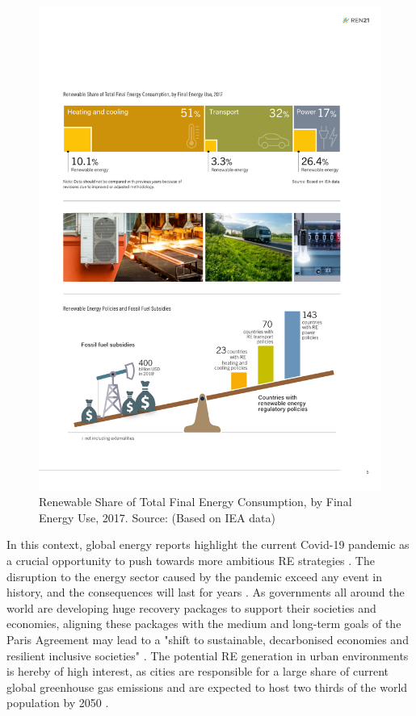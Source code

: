 \begin{figure}
\centering 
\includegraphics[width=\textwidth]{images/gsr_2020_RE_share.pdf} 
\caption[Renewable Share of Total Final Energy Consumption, by Final Energy Use, 2017]{Renewable Share of Total Final Energy Consumption, by Final Energy Use, 2017. Source: \citet{ren21_renewables_2020} (Based on IEA data)}
\label{fig:ren21_RE_use} 
\end{figure}
In this context, global energy reports highlight the current Covid-19 pandemic as a crucial opportunity to push towards more ambitious RE strategies \cite{iea_world_2020,irena_global_2020,fs-unep_global_2020}. 
The disruption to the energy sector caused by the pandemic exceed any event in history, and the consequences will last for years \cite{iea_world_2020}. 
As governments all around the world are developing huge recovery packages to support their societies and economies, aligning these packages with the medium and long-term goals of the Paris Agreement may lead to a "shift to sustainable, decarbonised economies and resilient inclusive societies" \cite{irena_global_2020}. 
The potential RE generation in urban environments is hereby of high interest, as cities are responsible for a large share of current global greenhouse gas emissions and are expected to host two thirds of the world population by 2050 \cite{irena_rise_2020}. 

